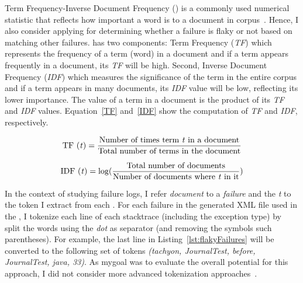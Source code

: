 Term Frequency-Inverse Document Frequency (\tfidf) is a commonly used numerical statistic that reflects how important a word is to a document in corpus~\cite{tfidf}.
Hence, I also consider applying \tfidf for determining whether a failure is flaky or not based on matching other failures. 
\tfidf has two components: Term Frequency (\emph{TF}) which represents the frequency of a term (word) in a document and if a term appears frequently in a document, its \emph{TF} will be high. Second, Inverse Document Frequency (\emph{IDF}) which measures the significance of the term in the entire corpus and if a term appears in many documents, its \emph{IDF} value will be low, reflecting its lower importance. The \tfidf value of a term in a document is the product of its \emph{TF} and \emph{IDF} values. Equation~\ref{TF} and~\ref{IDF} show the computation of \emph{TF} and \emph{IDF}, respectively. 

\begin{equation}
\label{TF}
\text{TF (\textit{t})} = \frac{\text{Number of times term \textit{t} in a document}}{\text{Total number of terms in the document}}
\end{equation}


\begin{equation}
\label{IDF}
\text{IDF (\textit{t})} = \log(\frac{\text{Total number of documents}}{\text{Number of documents where \textit{t} in it}})
\end{equation}


In the context of studying failure logs, I refer \emph{document} to a \emph{failure} and the \textit{t} to the token I extract from each \failure. 
For each failure in the generated XML file used in the \syntax, I tokenize each line of each stacktrace (including the exception type) by split the words using the \emph{dot} as separator (and removing the symbols such parentheses). 
For example, the last line in Listing~\ref{lst:flakyFailures} will be converted to the following set of tokens \textit{(tachyon, JournalTest, before, JournalTest, java, 33)}.
As mygoal was to evaluate the overall potential for this approach, I did not consider more advanced tokenization approaches~\cite{tfidf1}.




